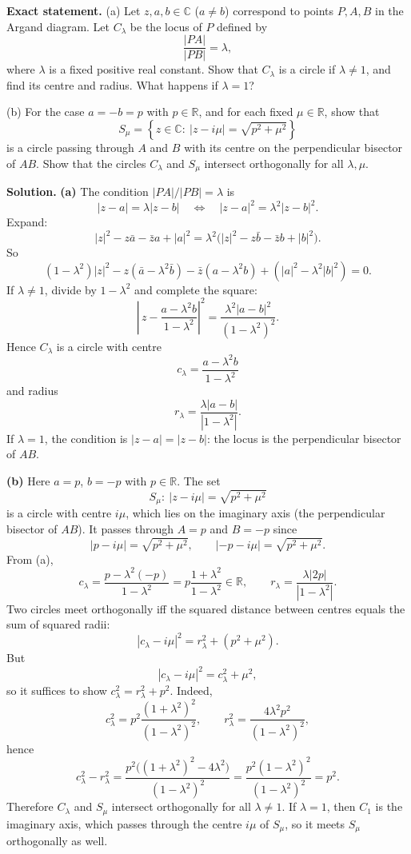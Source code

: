 \documentclass[12pt,a4paper]{article}
\theoremstyle{plain}
\theoremstyle{definition}      %
\begin{document}
\textbf{Exact statement.}
(a) Let \(z,a,b\in\mathbb C\) (\(a\neq b\)) correspond to points \(P,A,B\) in the Argand diagram.
Let \(C_\lambda\) be the locus of \(P\) defined by
\[
\frac{|PA|}{|PB|}=\lambda,
\]
where \(\lambda\) is a fixed positive real constant. Show that \(C_\lambda\) is a circle if \(\lambda\neq 1\),
and find its centre and radius. What happens if \(\lambda=1\)?

(b) For the case \(a=-b=p\) with \(p\in\mathbb R\), and for each fixed \(\mu\in\mathbb R\), show that
\[
S_\mu=\left\{z\in\mathbb C:\ |z-i\mu|=\sqrt{p^2+\mu^2}\right\}
\]
is a circle passing through \(A\) and \(B\) with its centre on the perpendicular bisector of \(AB\).
Show that the circles \(C_\lambda\) and \(S_\mu\) intersect orthogonally for all \(\lambda,\mu\).

\textbf{Solution.}
\textbf{(a)} The condition \(|PA|/|PB|=\lambda\) is
\[
|z-a|=\lambda |z-b|
\quad\Longleftrightarrow\quad
|z-a|^2=\lambda^2|z-b|^2.
\]
Expand:
\[
|z|^2- z\bar a-\bar z a+|a|^2=\lambda^2\bigl(|z|^2-z\bar b-\bar z b+|b|^2\bigr).
\]
So
\[
(1-\lambda^2)|z|^2- z(\bar a-\lambda^2\bar b)-\bar z(a-\lambda^2 b)+(|a|^2-\lambda^2|b|^2)=0.
\]
If \(\lambda\neq 1\), divide by \(1-\lambda^2\) and complete the square:
\[
\left|\,z-\frac{a-\lambda^2 b}{\,1-\lambda^2\,}\right|^2
=\frac{\lambda^2|a-b|^2}{(1-\lambda^2)^2}.
\]
Hence \(C_\lambda\) is a circle with centre
\[
c_\lambda=\frac{a-\lambda^2 b}{1-\lambda^2}
\]
and radius
\[
r_\lambda=\frac{\lambda|a-b|}{|1-\lambda^2|}.
\]
If \(\lambda=1\), the condition is \(|z-a|=|z-b|\): the locus is the perpendicular bisector of \(AB\).

\medskip
\noindent\textbf{(b)} Here \(a=p\), \(b=-p\) with \(p\in\mathbb R\). The set
\[
S_\mu:\ |z-i\mu|=\sqrt{p^2+\mu^2}
\]
is a circle with centre \(i\mu\), which lies on the imaginary axis (the perpendicular bisector of \(AB\)).
It passes through \(A=p\) and \(B=-p\) since
\[
|p-i\mu|=\sqrt{p^2+\mu^2},\qquad |-p-i\mu|=\sqrt{p^2+\mu^2}.
\]
From (a),
\[
c_\lambda=\frac{p-\lambda^2(-p)}{1-\lambda^2}=p\frac{1+\lambda^2}{1-\lambda^2}\in\mathbb R,\qquad
r_\lambda=\frac{\lambda|2p|}{|1-\lambda^2|}.
\]
Two circles meet orthogonally iff the squared distance between centres equals the sum of squared radii:
\[
|c_\lambda-i\mu|^2=r_\lambda^2+(p^2+\mu^2).
\]
But
\[
|c_\lambda-i\mu|^2=c_\lambda^2+\mu^2,
\]
so it suffices to show \(c_\lambda^2=r_\lambda^2+p^2\). Indeed,
\[
c_\lambda^2=p^2\frac{(1+\lambda^2)^2}{(1-\lambda^2)^2},\qquad
r_\lambda^2=\frac{4\lambda^2p^2}{(1-\lambda^2)^2},
\]
hence
\[
c_\lambda^2-r_\lambda^2
=\frac{p^2\bigl((1+\lambda^2)^2-4\lambda^2\bigr)}{(1-\lambda^2)^2}
=\frac{p^2(1-\lambda^2)^2}{(1-\lambda^2)^2}
=p^2.
\]
Therefore \(C_\lambda\) and \(S_\mu\) intersect orthogonally for all \(\lambda\neq 1\).
If \(\lambda=1\), then \(C_1\) is the imaginary axis, which passes through the centre \(i\mu\) of \(S_\mu\),
so it meets \(S_\mu\) orthogonally as well.
\end{document}
